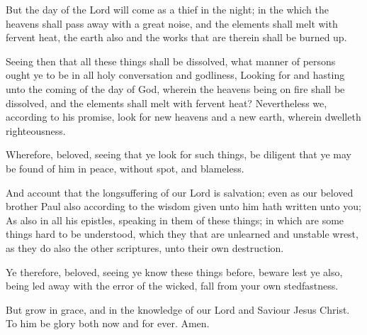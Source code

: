 \Verse But the day of the Lord will come as a thief in the night; in the which the heavens shall pass away with a great noise, and the elements shall melt with fervent heat, the earth also and the works that are therein shall be burned up.

\Verse Seeing then that all these things shall be dissolved, what manner of persons ought ye to be in all holy conversation and godliness, \Verse Looking for and hasting unto the coming of the day of God, wherein the heavens being on fire shall be dissolved, and the elements shall melt with fervent heat?  \Verse Nevertheless we, according to his promise, look for new heavens and a new earth, wherein dwelleth righteousness.

\Verse Wherefore, beloved, seeing that ye look for such things, be diligent that ye may be found of him in peace, without spot, and blameless.

\Verse And account that the longsuffering of our Lord is salvation; even as our beloved brother Paul also according to the wisdom given unto him hath written unto you; \Verse As also in all his epistles, speaking in them of these things; in which are some things hard to be understood, which they that are unlearned and unstable wrest, as they do also the other scriptures, unto their own destruction.

\Verse Ye therefore, beloved, seeing ye know these things before, beware lest ye also, being led away with the error of the wicked, fall from your own stedfastness.

\Verse But grow in grace, and in the knowledge of our Lord and Saviour Jesus Christ. To him be glory both now and for ever. Amen.

